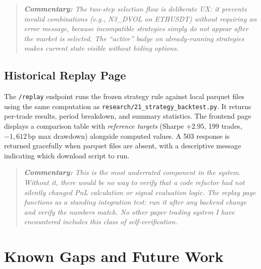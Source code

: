 \documentclass[11pt,a4paper]{article}
\newcommand{\code}[1]{\texttt{#1}}
\newcommand{\comment}[1]{%
  \begin{quote}
    \small\itshape\textbf{Commentary:} #1
  \end{quote}
}
\begin{document}
\comment{The two-step selection flow is deliberate UX: it prevents invalid combinations (e.g., N3\_DVOL on ETHUSDT) without requiring an error message, because incompatible strategies simply do not appear after the market is selected. The ``active'' badge on already-running strategies makes current state visible without hiding options.}

\subsection{Historical Replay Page}

The \code{/replay} endpoint runs the frozen strategy rule against local parquet files using the same computation as \code{research/21\_strategy\_backtest.py}. It returns per-trade results, period breakdown, and summary statistics. The frontend page displays a comparison table with \emph{reference targets} (Sharpe $+2.95$, 199 trades, $-1{,}612\,\text{bp}$ max drawdown) alongside computed values. A 503 response is returned gracefully when parquet files are absent, with a descriptive message indicating which download script to run.

\comment{This is the most underrated component in the system. Without it, there would be no way to verify that a code refactor had not silently changed PnL calculation or signal evaluation logic. The replay page functions as a standing integration test: run it after any backend change and verify the numbers match. No other paper trading system I have encountered includes this class of self-verification.}

\section{Known Gaps and Future Work}
\end{document}
